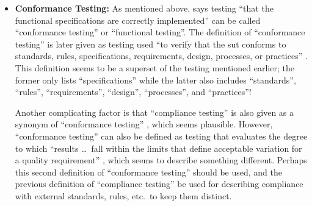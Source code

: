 \begin{itemize}
      \item \textbf{Conformance Testing:} As mentioned above,
            \citet[p.~5-7]{SWEBOK2024} says testing ``that the functional
            specifications are correctly implemented'' can be called
            ``conformance testing'' or ``functional testing''. The definition
            of ``conformance testing'' is later given as testing used ``to
            verify that the \acs{sut} conforms to standards, rules,
            specifications, requirements, design, processes, or practices''
            \citep[p.~5-7]{SWEBOK2024}. This definition seems to be a superset
            of the testing mentioned earlier; the former only lists
            ``specifications'' while the latter also includes ``standards'',
            ``rules'', ``requirements'', ``design'', ``processes'', and
            ``practices''!

            Another complicating factor is that ``compliance testing'' is also
            given as a synonym of ``conformance testing''
            \citep[p.~43]{Kam2008}, which seems plausible. However, ``conformance
            testing'' can also be defined as testing that evaluates the degree
            to which ``results \dots\ fall within the limits that define
            acceptable variation for a quality requirement''
            \citep[p.~93]{IEEE2017} , which seems to
            describe something different. Perhaps this second definition of
            ``conformance testing'' should be used, and the previous definition
            of ``compliance testing'' be used for describing compliance with
            external standards, rules, etc.~to keep them distinct.


\end{itemize}
